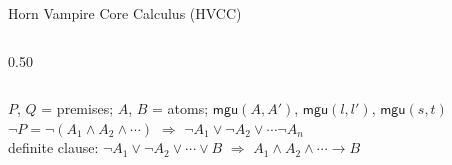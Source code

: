\documentclass[aspectratio=43]{beamer}
\begin{document}
\begin{frame}{Horn Vampire Core Calculus (HVCC)}
\begin{columns}[T]
\begin{column}{0.50\textwidth}
\begin{mathpar}
        \end{mathpar}
        \begin{mathpar}
        \end{mathpar}
        \begin{mathpar}
        \end{mathpar}
        \begin{mathpar}
        \end{mathpar}
        \begin{mathpar}
        \end{mathpar}
      \end{column}
    \end{columns}
    \vfill
    {\footnotesize $P$, $Q$ = premises;\; $A$, $B$ = atoms;\;
     $\mathsf{mgu}(A,A')$, $\mathsf{mgu}(l,l')$, $\mathsf{mgu}(s,t)$ \\}
    {\footnotesize $\neg P = \neg(A_1 \land A_2 \land \cdots)$ $\Longrightarrow$ $\neg A_1 \lor \neg A_2 \lor \cdots \neg A_n$ \\}
    {\footnotesize definite clause: $\neg A_1 \lor \neg A_2 \lor \cdots \lor B$ $\Longrightarrow$
                                    $A_1 \land A_2 \land \cdots \rightarrow B$ \\}
\end{frame}
\end{document}
